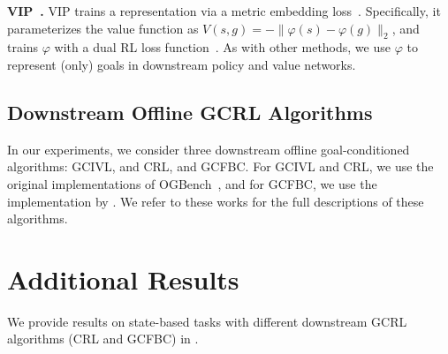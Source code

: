 \documentclass[final]{article} %
\theoremstyle{plain}
\theoremstyle{definition}
\theoremstyle{remark}
\renewcommand{\phi}{\varphi}
\begin{document}
\textbf{VIP~\citep{vip_ma2023}.}
VIP trains a representation via a metric embedding loss~\citep{dualrl_sikchi2024}.
Specifically, it parameterizes the value function as $V(s, g) = -\|\phi(s) - \phi(g)\|_2$,
and trains $\phi$ with a dual RL loss function~\citep{gofar_ma2022, vip_ma2023, dualrl_sikchi2024}.
As with other methods, we use $\phi$ to represent (only) goals in downstream policy and value networks.



%
%
%
%
%
%
%
%
%
%
%
%
%
%

%
%
%

%
%
%
%
%
%
%
%
%
%
%



%
%

%
%
%

%
%
%


%
%
%
%
%
%
%
%
%

%

%
%
%
%
%
%
%
%
%

%

%

%
%
%
%

%
%

\subsection{Downstream Offline GCRL Algorithms}
In our experiments, we consider three downstream offline goal-conditioned algorithms:
GCIVL, and CRL, and GCFBC.
For GCIVL and CRL,
we use the original implementations of OGBench~\citep{ogbench_park2025},
and for GCFBC, we use the implementation by \citet{sharsa_park2025}.
We refer to these works for the full descriptions of these algorithms.

%
%
%
%
%
%
%
%
%
%
%
%
%
%
%
%
%

%
%
%
%
%
%
%
%
%


%
%
%
%
%


%
%
%
%
%
%
%
%
%

%
%
%
%
%

%


\section{Additional Results}
\label{sec:add_results}



We provide results on state-based tasks with different downstream GCRL algorithms (CRL and GCFBC) in .
\end{document}
